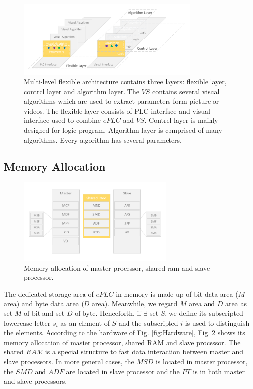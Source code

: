 \documentclass[journal,UTF8]{IEEEtran}
\begin{document}
\begin{figure}
	\centering
	\includegraphics[width=3.5in]{fig/Software.pdf}
	\caption{Multi-level flexible architecture contains three layers: flexible layer, control layer and algorithm layer. The $VS$ contains several visual algorithms which are used to extract parameters form picture or videos. The flexible layer consists of PLC interface and visual interface used to combine $ePLC$ and $VS$. Control layer is mainly designed for logic program. Algorithm layer is comprised of many algorithms. Every algorithm has several parameters.}
	\label{fig:Software}
\end{figure}


\subsection{Memory Allocation}
\begin{figure}
	\centering
	\includegraphics[width=3in]{fig/RAM.pdf}
	\caption{Memory allocation of master processor, shared ram and slave processor.}
	\label{fig:RAM}
\end{figure}
 The dedicated storage area of $ePLC$ in memory is made up of bit data area ($M$ area) and byte data area ($D$ area). Meanwhile, we regard $M$ area and $D$ area as set $M$ of bit and set $D$ of byte. Henceforth, if $\exists$ set $S$, we define its subscripted lowercase letter $s_i$ as an element of $S$ and the subscripted $i$ is used to distinguish the elements. According to the hardware of Fig. \ref{fig:Hardware}, Fig. \ref{fig:RAM} shows its memory allocation of master processor, shared RAM and slave processor. The shared $RAM$ is a special structure to fast data interaction between master and slave processors. In more general cases, the $MSD$ is located in master processor, the $SMD$ and $ADF$ are located in slave processor and the $PT$ is in both master and slave processors. 
\end{document}
